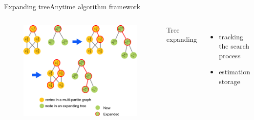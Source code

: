 \begin{frame}{Expanding tree}{Anytime algorithm framework}
	
	\begin{columns}
		
		\begin{minipage}{\textwidth}
			\begin{figure}
				\centering
				\includegraphics[width=\textwidth]{./figure/tree_expanding_process}
			\end{figure}
		\end{minipage}
		
		
		\begin{minipage}{\textwidth}
			
			Tree expanding
			
			\begin{itemize}
				\item tracking the search process
				\item estimation storage
			\end{itemize}
		\end{minipage}
		
	\end{columns}
	
\end{frame}

